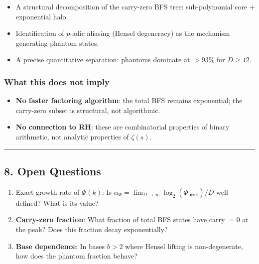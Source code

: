 \documentclass[
  11pt,
]{article}
\providecommand{\tightlist}{%
  \setlength{\itemsep}{0pt}\setlength{\parskip}{0pt}}
\begin{document}
\begin{itemize}
\tightlist
\item
  A structural decomposition of the carry-zero BFS tree: sub-polynomial core +
  exponential halo.
\item
  Identification of \(p\)-adic aliasing (Hensel degeneracy) as the mechanism
  generating phantom states.
\item
  A precise quantitative separation: phantoms dominate at \(> 93\%\) for
  \(D \geq 12\).
\end{itemize}

\subsubsection{What this does not imply}\label{what-this-does-not-imply}

\begin{itemize}
\tightlist
\item
  \textbf{No faster factoring algorithm}: the total BFS remains exponential; the
  carry-zero subset is structural, not algorithmic.
\item
  \textbf{No connection to RH}: these are combinatorial properties of binary
  arithmetic, not analytic properties of \(\zeta(s)\).
\end{itemize}

\begin{center}\rule{0.5\linewidth}{0.5pt}\end{center}

\newpage

\subsection{8. Open Questions}\label{open-questions}

\begin{enumerate}
\def\labelenumi{\arabic{enumi}.}
\tightlist
\item
  Exact growth rate of \(\Phi(k)\): Is
  \(\alpha_{\Phi} = \lim_{D \to \infty} \log_2(\Phi_{\text{peak}}) / D\)
  well-defined? What is its value?
\item
  \textbf{Carry-zero fraction}: What fraction of total BFS states have carry
  \(= 0\) at the peak? Does this fraction decay exponentially?
\item
  \textbf{Base dependence}: In bases \(b > 2\) where Hensel lifting is
  non-degenerate, how does the phantom fraction behave?
\end{enumerate}
\end{document}
